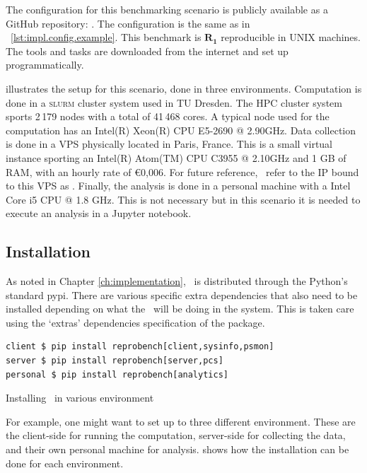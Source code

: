 The configuration for this benchmarking scenario is publicly available as a GitHub repository: \href{https://github.com/rkkautsar/benchmark-demo-sat}{}.
The configuration is the same as in \lst~\ref{lst:impl.config.example}.
This benchmark is \(\bm{R_1}\) reproducible in UNIX machines.
The tools and tasks are downloaded from the internet and set up programmatically.

 illustrates the setup for this scenario, done in three environments.
Computation is done in a \textsc{slurm} cluster system \citep{yoo2003slurm} used in TU Dresden.
The HPC cluster system sports 2\,179 nodes with a total of 41\,468 cores.
A typical node used for the computation has an Intel(R) Xeon(R) CPU E5-2690 @ 2.90GHz.
Data collection is done in a VPS physically located in Paris, France.
This is a small virtual instance sporting an Intel(R) Atom(TM) CPU C3955 @ 2.10GHz and 1 GB of RAM, with an hourly rate of \euro{}0,006.
For future reference, \first~refer to the IP bound to this VPS as .
Finally, the analysis is done in a personal machine with a Intel Core i5 CPU @ 1.8 GHz.
This is not necessary but in this scenario it is needed to execute an analysis in a Jupyter notebook.

\subsection{Installation}

As noted in Chapter \ref{ch:implementation}, \OurBenchmarkingTool~is distributed through the Python's standard pypi.
There are various specific extra dependencies that also need to be installed depending on what the \OurBenchmarkingTool~will be doing in the system.
This is taken care using the `extras' dependencies specification of the package.

\begin{listing}
	\begin{verbatim}
client $ pip install reprobench[client,sysinfo,psmon]
server $ pip install reprobench[server,pcs]
personal $ pip install reprobench[analytics]
    \end{verbatim}
	\caption{Installing \OurBenchmarkingTool~in various environment}
	\label{lst:eval.install}
\end{listing}

For example, one might want to set up to three different environment.
These are the client-side for running the computation, server-side for collecting the data, and their own personal machine for analysis.
 shows how the installation can be done for each environment.

